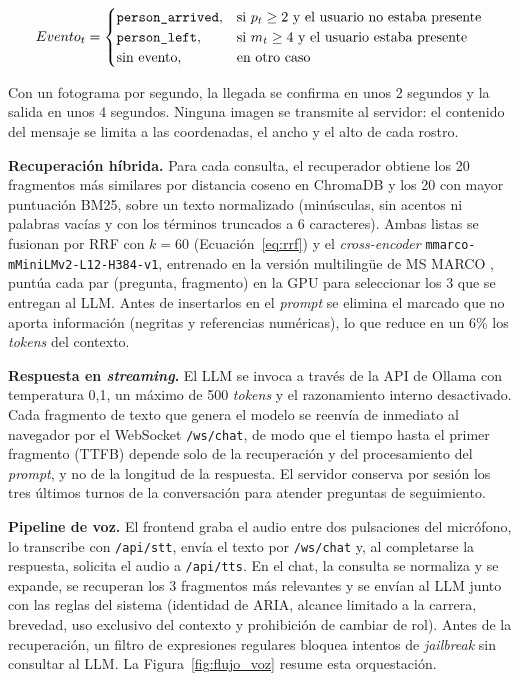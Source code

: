 \begin{equation}
\label{eq:presence}
Evento_t =
\begin{cases}
\texttt{person\_\allowbreak{}arrived}, & \text{si } p_t \geq 2 \text{ y el usuario no estaba presente} \\
\texttt{person\_left}, & \text{si } m_t \geq 4 \text{ y el usuario estaba presente} \\
\text{sin evento}, & \text{en otro caso}
\end{cases}
\end{equation}

Con un fotograma por segundo, la llegada se confirma en unos 2 segundos y la salida en unos 4 segundos. Ninguna imagen se transmite al servidor: el contenido del mensaje se limita a las coordenadas, el ancho y el alto de cada rostro.

\textbf{Recuperación híbrida.} Para cada consulta, el recuperador obtiene los 20 fragmentos más similares por distancia coseno en ChromaDB y los 20 con mayor puntuación BM25, sobre un texto normalizado (minúsculas, sin acentos ni palabras vacías y con los términos truncados a 6 caracteres). Ambas listas se fusionan por RRF con $k = 60$ (Ecuación~\ref{eq:rrf}) y el \textit{cross-encoder} \texttt{mmarco-\allowbreak{}mMiniLMv2-\allowbreak{}L12-\allowbreak{}H384-\allowbreak{}v1}, entrenado en la versión multilingüe de MS MARCO \cite{bonifacio2021mmarco}, puntúa cada par (pregunta, fragmento) en la GPU para seleccionar los 3 que se entregan al LLM. Antes de insertarlos en el \textit{prompt} se elimina el marcado que no aporta información (negritas y referencias numéricas), lo que reduce en un 6\% los \textit{tokens} del contexto.

\textbf{Respuesta en \textit{streaming}.} El LLM se invoca a través de la API de Ollama con temperatura 0,1, un máximo de 500 \textit{tokens} y el razonamiento interno desactivado. Cada fragmento de texto que genera el modelo se reenvía de inmediato al navegador por el WebSocket \texttt{/ws/chat}, de modo que el tiempo hasta el primer fragmento (TTFB) depende solo de la recuperación y del procesamiento del \textit{prompt}, y no de la longitud de la respuesta. El servidor conserva por sesión los tres últimos turnos de la conversación para atender preguntas de seguimiento.

\textbf{Pipeline de voz.} El frontend graba el audio entre dos pulsaciones del micrófono, lo transcribe con \texttt{/api/stt}, envía el texto por \texttt{/ws/chat} y, al completarse la respuesta, solicita el audio a \texttt{/api/tts}. En el chat, la consulta se normaliza y se expande, se recuperan los 3 fragmentos más relevantes y se envían al LLM junto con las reglas del sistema (identidad de ARIA, alcance limitado a la carrera, brevedad, uso exclusivo del contexto y prohibición de cambiar de rol). Antes de la recuperación, un filtro de expresiones regulares bloquea intentos de \textit{jailbreak} sin consultar al LLM. La Figura~\ref{fig:flujo_voz} resume esta orquestación.

